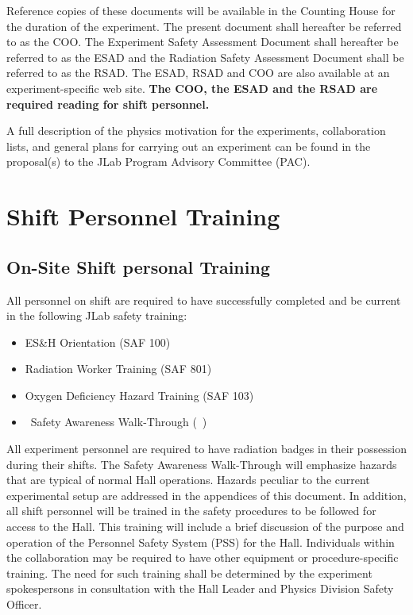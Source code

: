 \documentclass[11pt]{article}
\begin{document}

Reference copies of these documents will be available in the Counting 
House for the duration of the experiment. The present document shall 
hereafter be referred to as the COO. The Experiment Safety Assessment 
Document shall hereafter be referred to as the ESAD and the
Radiation Safety Assessment Document shall be referred to as the RSAD.
The ESAD, RSAD and COO are also available at an experiment-specific 
web site. {\bf The COO, the ESAD and the RSAD are required reading for 
shift personnel.}

A full description of the physics motivation for the experiments, collaboration 
lists, and general plans for carrying out an experiment can be found in the
proposal(s) to the JLab Program Advisory Committee (PAC). 

\section{Shift Personnel Training}
\indent
\subsection{On-Site Shift personal Training}

All personnel on shift are required to have successfully completed and be 
current in the following JLab safety training:

\begin{itemize}

\item ES\&H Orientation (SAF 100) 

\item Radiation Worker Training (SAF 801) 

\item Oxygen Deficiency Hazard Training (SAF 103) 

\item \HALL\ Safety Awareness Walk-Through (\AWARENESS\ )

\end{itemize}

 All experiment personnel are 
required to have radiation badges in their possession during their shifts. 
The Safety Awareness Walk-Through will
emphasize hazards that are typical of normal Hall operations.
Hazards  peculiar to the current experimental setup are addressed in the appendices 
of this document. 
In addition, all shift personnel will be trained in the safety procedures to be
followed for access to the Hall. This
training will include a brief discussion of the purpose and operation of the
Personnel Safety System (PSS) for the Hall. 
Individuals within the collaboration may be required to have other equipment 
or procedure-specific training. The need for such
training shall be determined by the experiment spokespersons in consultation 
with the Hall Leader and Physics Division Safety Officer.
\end{document}
